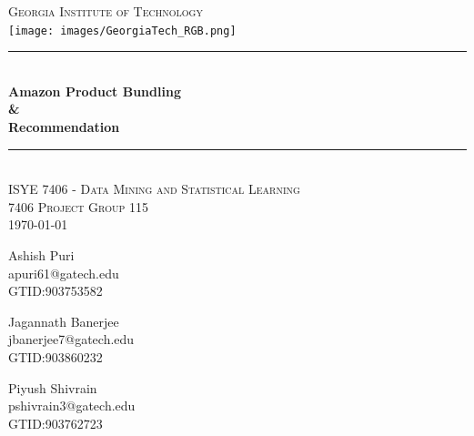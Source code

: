 \documentclass[11pt]{article} %
\begin{document}
    \begin{titlepage}
    
    \newcommand{\HRule}{\rule{\linewidth}{0.5mm}} %
    
    \center %
    
    \textsc{\LARGE Georgia Institute of Technology}\\[1.5cm] %
    \texttt{[image: images/GeorgiaTech\_RGB.png]}\\[1cm] %
    
    
    \HRule \\[0.4cm]
    { \huge \bfseries Amazon Product Bundling\\\&\\Recommendation}\\[0.4cm] %
    \HRule \\[1.5cm]
    
    \textsc{\Large ISYE 7406 -  Data Mining and Statistical Learning}\\[0.5cm]
    \textsc{\large 7406 Project Group 115}\\[0.6cm]
    {\large \today}\\[2cm]
    \begin{center}
    \begin{minipage}{0.33\textwidth}
        \centering
        {\Large Ashish Puri} \\
        apuri61@gatech.edu \\
        GTID:903753582
    \end{minipage}%
    \begin{minipage}{0.33\textwidth}
        \centering
        {\Large Jagannath Banerjee} \\
        jbanerjee7@gatech.edu \\
        GTID:903860232
    \end{minipage}
    \begin{minipage}{0.33\textwidth}
        \centering
        {\Large Piyush Shivrain} \\
        pshivrain3@gatech.edu \\
        GTID:903762723
    \end{minipage}
    \end{center}
\end{titlepage}
\end{document}
